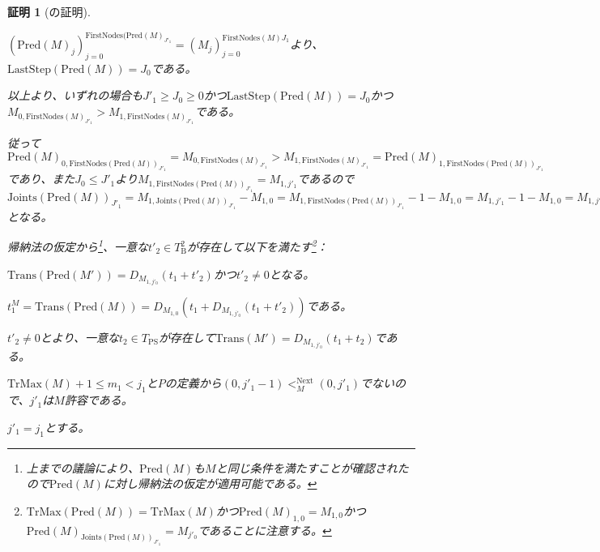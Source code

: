 \documentclass[dvipdfmx,uplatex]{jsarticle}
\theoremstyle{customnonumberbreakfortheorem}
\theoremstyle{customnonumberbreakforproof}
\newtheorem{hideableproof}{証明}
\begin{document}
\begin{hideableproof}[の証明]
\begin{indented}
\begin{indented}
\begin{indented}
				\item \((\textrm{Pred}(M)_j)_{j=0}^{\textrm{FirstNodes}(\textrm{Pred}(M)_{J'_1}} = (M_j)_{j=0}^{\textrm{FirstNodes}(M){J_1}}\)より、\(\textrm{LastStep}(\textrm{Pred}(M)) = J_0\)である。
			\end{indented}
			\item
			\item 以上より、いずれの場合も\(J'_1 \geq J_0 \geq 0\)かつ\(\textrm{LastStep}(\textrm{Pred}(M)) = J_0\)かつ\(M_{0,\textrm{FirstNodes}(M)_{J'_1}} > M_{1,\textrm{FirstNodes}(M)_{J'_1}}\)である。
			\item 従って\(\textrm{Pred}(M)_{0,\textrm{FirstNodes}(\textrm{Pred}(M))_{J'_1}} = M_{0,\textrm{FirstNodes}(M)_{J'_1}} > M_{1,\textrm{FirstNodes}(M)_{J'_1}} = \textrm{Pred}(M)_{1,\textrm{FirstNodes}(\textrm{Pred}(M))_{J'_1}}\)であり、また\(J_0 \leq J'_1\)より\(M_{1,\textrm{FirstNodes}(\textrm{Pred}(M))_{J'_1}} = M_{1,j'_1}\)であるので\(\textrm{Joints}(\textrm{Pred}(M))_{J'_1} = M_{1,\textrm{Joints}(\textrm{Pred}(M))_{J'_1}} - M_{1,0} = M_{1,\textrm{FirstNodes}(\textrm{Pred}(M))_{J'_1}} - 1 - M_{1,0} = M_{1,j'_1} - 1 - M_{1,0} = M_{1,j'_0} - M_{1,0} = j'_0 > 0\)となる。
			\item 帰納法の仮定から\footnote{上までの議論により、\(\textrm{Pred}(M)\)も\(M\)と同じ条件を満たすことが確認されたので\(\textrm{Pred}(M)\)に対し帰納法の仮定が適用可能である。}、一意な\(t'_2 \in T_{\textrm{B}}^2\)が存在して以下を満たす\footnote{\(\textrm{TrMax}(\textrm{Pred}(M)) = \textrm{TrMax}(M)\)かつ\(\textrm{Pred}(M)_{1,0} = M_{1,0}\)かつ\(\textrm{Pred}(M)_{\textrm{Joints}(\textrm{Pred}(M))_{J'_1}} = M_{j'_0}\)であることに注意する。}：
			\begin{penumerate}
				\setcounter{penumeratei}{2}
				\item \(\textrm{Trans}(\textrm{Pred}(M')) = D_{M_{1,j'_0}}(t_1 + t'_2)\)かつ\(t'_2 \neq 0\)となる。
				\item \(t_1^M = \textrm{Trans}(\textrm{Pred}(M)) = D_{M_{1,0}}(t_1 + D_{M_{1,j'_0}}(t_1 + t'_2))\)である。
			\end{penumerate}
			\item \(t'_2 \neq 0\)とより、一意な\(t_2 \in T_{\textrm{PS}}\)が存在して\(\textrm{Trans}(M') = D_{M_{1,j'_0}}(t_1 + t_2)\)である。
			\item \(\textrm{TrMax}(M)+1 \leq m_1 < j_1\)と\(P\)の定義から\((0,j'_1-1) <_M^{\textrm{Next}} (0,j'_1)\)でないので、\(j'_1\)は\(M\)許容である。
			\item
			\item \(j'_1 = j_1\)とする。

\end{indented}
\end{indented}
\end{hideableproof}
\end{document}
